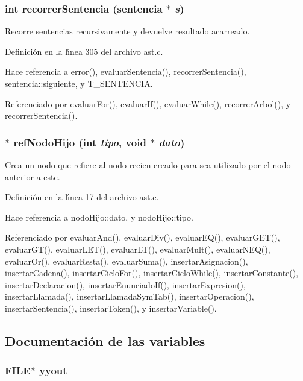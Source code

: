 \subsubsection{\setlength{\rightskip}{0pt plus 5cm}int recorrer\-Sentencia ({\bf sentencia} $\ast$ {\em s})}\label{ast_8c_a21}


Recorre sentencias recursivamente y devuelve resultado acarreado. 



Definici\'{o}n en la l\'{\i}nea 305 del archivo ast.c.

Hace referencia a error(), evaluar\-Sentencia(), recorrer\-Sentencia(), sentencia::siguiente, y T\_\-SENTENCIA.

Referenciado por evaluar\-For(), evaluar\-If(), evaluar\-While(), recorrer\-Arbol(), y recorrer\-Sentencia().
\subsubsection{$\ast$ ref\-Nodo\-Hijo (int {\em tipo}, void $\ast$ {\em dato})}\label{ast_8c_a1}


Crea un nodo que refiere al nodo recien creado para sea utilizado por el nodo anterior a este. 



Definici\'{o}n en la l\'{\i}nea 17 del archivo ast.c.

Hace referencia a nodo\-Hijo::dato, y nodo\-Hijo::tipo.

Referenciado por evaluar\-And(), evaluar\-Div(), evaluar\-EQ(), evaluar\-GET(), evaluar\-GT(), evaluar\-LET(), evaluar\-LT(), evaluar\-Mult(), evaluar\-NEQ(), evaluar\-Or(), evaluar\-Resta(), evaluar\-Suma(), insertar\-Asignacion(), insertar\-Cadena(), insertar\-Ciclo\-For(), insertar\-Ciclo\-While(), insertar\-Constante(), insertar\-Declaracion(), insertar\-Enunciado\-If(), insertar\-Expresion(), insertar\-Llamada(), insertar\-Llamada\-Sym\-Tab(), insertar\-Operacion(), insertar\-Sentencia(), insertar\-Token(), y insertar\-Variable().

\subsection{Documentaci\'{o}n de las variables}
\subsubsection{\setlength{\rightskip}{0pt plus 5cm}FILE$\ast$ {\bf yyout}}\label{ast_8c_a0}


